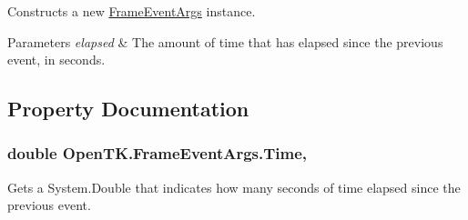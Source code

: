 Constructs a new \hyperlink{class_open_t_k_1_1_frame_event_args}{Frame\-Event\-Args} instance. 


\begin{DoxyParams}{Parameters}
{\em elapsed} & The amount of time that has elapsed since the previous event, in seconds.\\
\hline
\end{DoxyParams}


\subsection{Property Documentation}
\hypertarget{class_open_t_k_1_1_frame_event_args_aee05f4349255e7798599c301759d6211}{
\subsubsection[{Time}]{\setlength{\rightskip}{0pt plus 5cm}double Open\-T\-K.\-Frame\-Event\-Args.\-Time\hspace{0.3cm}{\ttfamily [get]}, {\ttfamily [set]}}}\label{class_open_t_k_1_1_frame_event_args_aee05f4349255e7798599c301759d6211}


Gets a System.\-Double that indicates how many seconds of time elapsed since the previous event. 

